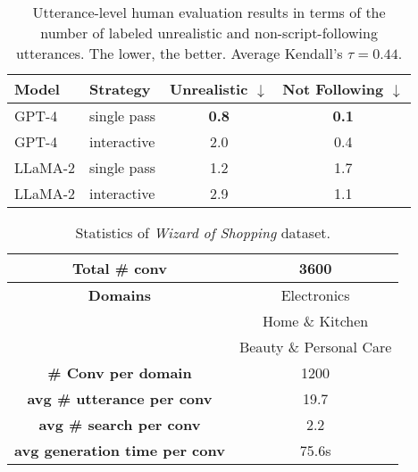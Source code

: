\begin{table}[t] \small
\centering
\setlength{\tabcolsep}{3pt} %
\begin{tabular}{llcc}
\hline
\textbf{Model} & \textbf{Strategy} & \textbf{Unrealistic $\downarrow$} & \textbf{Not Following $\downarrow$}\\ \hline
GPT-4 & single pass & \textbf{0.8} & \textbf{0.1}\\ \hline
GPT-4 & interactive & 2.0 & 0.4 \\ \hline
LLaMA-2 & single pass & 1.2 & 1.7 \\ \hline
LLaMA-2 & interactive & 2.9 & 1.1 \\ \hline

\end{tabular}
\vspace{-1em}
\caption{Utterance-level human evaluation results in terms of the number of labeled unrealistic and non-script-following utterances. The lower, the better. Average Kendall's $\tau = 0.44$.}
\label{tab:utterance_level_human_evaluation}
\vspace{-2em}
\end{table}

\begin{table}[t] \small
\centering
\setlength{\tabcolsep}{3pt} %
\begin{tabular}{cc}
\hline
\textbf{Total \# conv} & 3600\\ \hline
\textbf{Domains} & Electronics\\ 
 & Home \& Kitchen\\ 
 & Beauty \& Personal Care\\ \hline
\textbf{\# Conv per domain} & 1200\\ \hline
\textbf{avg \# utterance per conv} & 19.7\\ \hline
\textbf{avg \# search per conv} & 2.2\\ \hline
\textbf{avg generation time per conv} & 75.6s\\ \hline
\end{tabular}
\vspace{-1em}
\caption{Statistics of \textit{Wizard of Shopping} dataset.}
\label{tab:stats}
\vspace{-2em}
\end{table}


